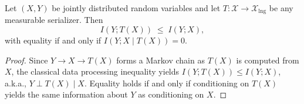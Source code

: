 \documentclass{llmxive}
\begin{document}
{\begin{lemma}
\label{lem:dpi}
Let $(X,Y)$ be jointly distributed random variables and let $T:\mathcal{X}\to\mathcal{X}_{\mathrm{lng}}$ be any measurable serializer. Then
\begin{equation}
I(Y;T(X))\;\le\;I(Y;X),
\end{equation}
with equality if and only if $I(Y;X\mid T(X))=0$.
\end{lemma}
\begin{proof}
Since $Y\to X\to T(X)$ forms a Markov chain as $T(X)$ is computed from $X$, the classical data processing inequality yields $I(Y;T(X))\le I(Y;X)$, a.k.a., $Y \perp T(X) \mid X$. Equality holds if and only if conditioning on $T(X)$ yields the same information about $Y$ as conditioning on $X$.
\end{proof}

}
\end{document}
